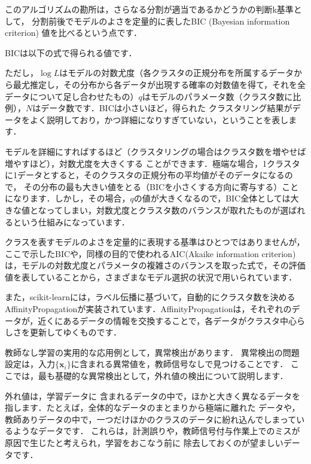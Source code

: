 このアルゴリズムの勘所は，さらなる分割が適当であるかどうかの判断k基準として，
分割前後でモデルのよさを定量的に表したBIC (Bayesian information criterion) 値を比べるという点です．

BICは以下の式で得られる値です．

ただし，$\log L$はモデルの対数尤度（各クラスタの正規分布を所属するデータから最尤推定し，その分布から各データが出現する確率の対数値を得て，それを全データについて足し合わせたもの）$q$はモデルのパラメータ数（クラスタ数に比例），$N$はデータ数です．BICは小さいほど，得られた
クラスタリング結果がデータをよく説明しており，かつ詳細になりすぎていない，ということを表します．

モデルを詳細にすればするほど（クラスタリングの場合はクラスタ数を増やせば増やすほど），対数尤度を大きくする
ことができます．極端な場合，1クラスタに1データとすると，そのクラスタの正規分布の平均値がそのデータになるので，
その分布の最も大きい値をとる（BICを小さくする方向に寄与する）ことになります．しかし，その場合，$q$の値が大きくなるので，BIC全体としては大きな値となってしまい，対数尤度とクラスタ数のバランスが取れたものが選ばれるという仕組みになっています．

クラスを表すモデルのよさを定量的に表現する基準はひとつではありませんが，ここで示したBICや，同様の目的で使われるAIC(Akaike information criterion)は，モデルの対数尤度とパラメータの複雑さのバランスを取った式で，その評価値を表していることから，さまざまなモデル選択の状況で用いられています．


また，scikit-learnには，ラベル伝播に基づいて，自動的にクラスタ数を決める AffinityPropagationが実装されています．AffinityPropagationは，それぞれのデータが，近くにあるデータの情報を交換することで，各データがクラスタ中心らしさを更新してゆくものです．


教師なし学習の実用的な応用例として，異常検出があります．
異常検出の問題設定は，入力$\{\bm{x}_i\}$に含まれる異常値を，教師信号なしで見つけることです．
ここでは，最も基礎的な異常検出として，外れ値の検出について説明します．

外れ値は，学習データに
含まれるデータの中で，ほかと大きく異なるデータを指します．たとえば，全体的なデータのまとまりから極端に離れた
データや，教師ありデータの中で，一つだけほかのクラスのデータに紛れ込んでしまっているようなデータです．
これらは，計測誤りや，教師信号付与作業上でのミスが原因で生じたと考えられ，学習をおこなう前に
除去しておくのが望ましいデータです．


